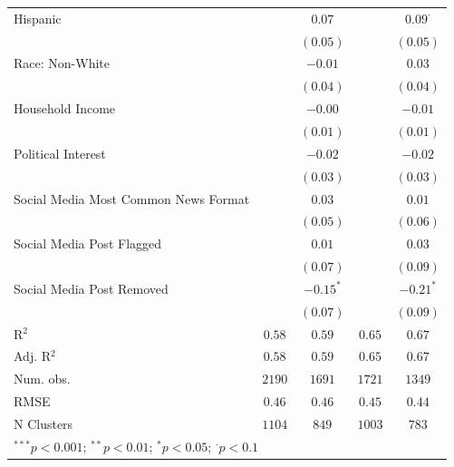 \begin{table}[!htpb]
\begin{center}
{\begin{tabular}{l c c c c}
Hispanic                             &               & $0.07$        &               & $0.09^{\cdot}$  \\
                                     &               & $(0.05)$      &               & $(0.05)$        \\
Race: Non-White                      &               & $-0.01$       &               & $0.03$          \\
                                     &               & $(0.04)$      &               & $(0.04)$        \\
Household Income                     &               & $-0.00$       &               & $-0.01$         \\
                                     &               & $(0.01)$      &               & $(0.01)$        \\
Political Interest                   &               & $-0.02$       &               & $-0.02$         \\
                                     &               & $(0.03)$      &               & $(0.03)$        \\
Social Media Most Common News Format &               & $0.03$        &               & $0.01$          \\
                                     &               & $(0.05)$      &               & $(0.06)$        \\
Social Media Post Flagged            &               & $0.01$        &               & $0.03$          \\
                                     &               & $(0.07)$      &               & $(0.09)$        \\
Social Media Post Removed            &               & $-0.15^{*}$   &               & $-0.21^{*}$     \\
                                     &               & $(0.07)$      &               & $(0.09)$        \\
\hline
R$^2$                                & $0.58$        & $0.59$        & $0.65$        & $0.67$          \\
Adj. R$^2$                           & $0.58$        & $0.59$        & $0.65$        & $0.67$          \\
Num. obs.                            & $2190$        & $1691$        & $1721$        & $1349$          \\
RMSE                                 & $0.46$        & $0.46$        & $0.45$        & $0.44$          \\
N Clusters                           & $1104$        & $849$         & $1003$        & $783$           \\
\hline
\multicolumn{5}{l}{\scriptsize{$^{***}p<0.001$; $^{**}p<0.01$; $^{*}p<0.05$; $^{\cdot}p<0.1$}}
\end{tabular}
}
\label{tab:mainmodel-mainspecification-remove-weighted-clusteredses-ld}
\end{center}
\end{table}
